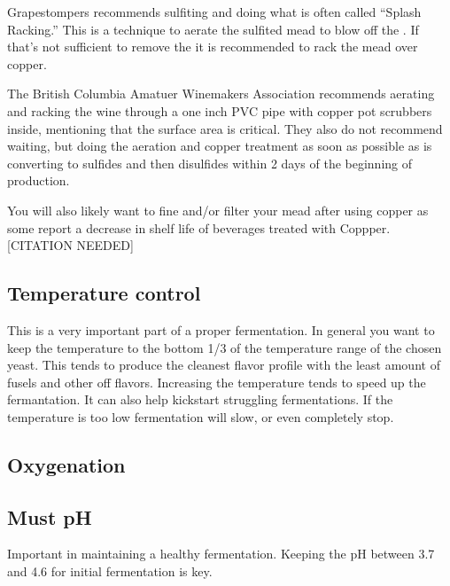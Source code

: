 \documentclass{article}
\begin{document}
   Grapestompers\cite{grapestompers-H2S}
   recommends sulfiting and doing what is often called  ``Splash Racking.'' This is a technique to aerate the sulfited mead to blow off the . If that's not
   sufficient to remove the  it is recommended to rack the mead over copper. 

   The British Columbia Amatuer Winemakers Association\cite{bcawa-H2S} recommends
   aerating and racking the wine through a one inch PVC pipe with copper pot scrubbers inside, mentioning that the surface area is critical. They also do not recommend
   waiting, but doing the aeration and copper treatment as soon as possible as  is converting to sulfides and then disulfides within 2 days of the 
   beginning of  production.

   You will also likely want to fine and/or filter your mead after using copper as some report a decrease in shelf life of beverages treated with Coppper.[CITATION NEEDED]

 \subsection{Temperature control}
  This is a very important part of a proper fermentation. In general you want to keep the temperature to the bottom 1/3 of the temperature range of the chosen yeast. 
  This tends to produce the cleanest flavor profile with the least amount of fusels and other off flavors. Increasing the temperature tends to speed up the fermantation.
  It can also help kickstart struggling fermentations. If the temperature is too low fermentation will slow, or even completely stop.

 \subsection{Oxygenation}

 \subsection{Must pH}
  Important in maintaining a healthy fermentation. Keeping the pH between 3.7 and 4.6 for initial fermentation is key.
\end{document}
